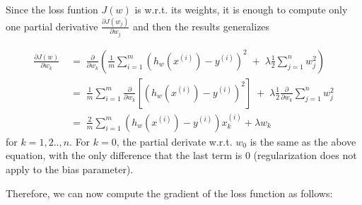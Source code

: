 \documentclass[12pt]{report}
\begin{document}
\noindent Since the loss funtion $J(w)$ is  w.r.t. its weights,
it is enough to compute only one partial derivative
$\frac{\partial J(w_j)}{\partial w_j}$ and then the results generalizes

\begin{equation*}
    \begin{aligned}
        \frac{\partial J(w)}{\partial w_k} \;&=\;
            \frac{\partial}{\partial w_k} \left( \frac{1}{m} \sum_{i=1}^m \left(h_w(x^{(i)}) - y^{(i)} \right)^2 \;+\;
            \lambda \frac{1}{2} \sum_{j=1}^n w_j^2 \right) \\[8pt]
        &=\; \frac{1}{m} \sum_{i=1}^m \frac{\partial}{\partial w_k} \left[ \left(h_w(x^{(i)}) - y^{(i)} \right)^2 \right] \;+\;
            \lambda \frac{1}{2} \frac{\partial}{\partial w_k}  \sum_{j=1}^n w_j^2 \\[8pt]
        &=\; \frac{2}{m} \sum_{i=1}^m \left(h_w(x^{(i)}) - y^{(i)} \right)x_k^{(i)} +
            \lambda w_k
    \end{aligned}
\end{equation*}
for $k = 1, 2.., n$. For $k=0$, the partial derivate w.r.t. $w_0$ is the same as the above equation, with the only difference that the last term is 0 (regularization does not apply to the bias parameter).
\bigskip

\noindent Therefore, we can now compute the gradient of the loss function as follows:
\end{document}
